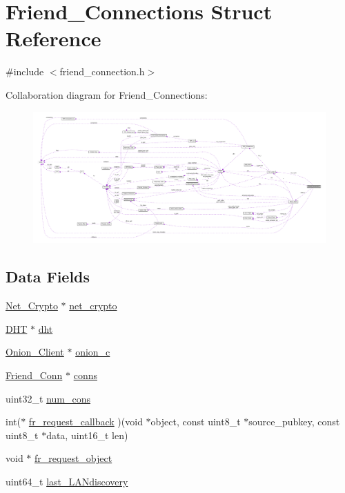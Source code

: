\hypertarget{struct_friend___connections}{\section{Friend\+\_\+\+Connections Struct Reference}
\label{struct_friend___connections}
}


{\ttfamily \#include $<$friend\+\_\+connection.\+h$>$}



Collaboration diagram for Friend\+\_\+\+Connections\+:
\nopagebreak
\begin{figure}[H]
\begin{center}
\leavevmode
\includegraphics[width=350pt]{dd/d84/struct_friend___connections__coll__graph}
\end{center}
\end{figure}
\subsection*{Data Fields}
\begin{DoxyCompactItemize}
\item 
\hyperlink{struct_net___crypto}{Net\+\_\+\+Crypto} $\ast$ \hyperlink{struct_friend___connections_ab06a41217a1e9b5985555e19e088ae94}{net\+\_\+crypto}
\item 
\hyperlink{struct_d_h_t}{D\+H\+T} $\ast$ \hyperlink{struct_friend___connections_a8b3d6ce8745acc52695e252bdb1531b6}{dht}
\item 
\hyperlink{struct_onion___client}{Onion\+\_\+\+Client} $\ast$ \hyperlink{struct_friend___connections_ae202b81f9a2c2fa80fd310a0996795fc}{onion\+\_\+c}
\item 
\hyperlink{struct_friend___conn}{Friend\+\_\+\+Conn} $\ast$ \hyperlink{struct_friend___connections_a2690adb6c61682af2e8592f53e9de9a0}{conns}
\item 
uint32\+\_\+t \hyperlink{struct_friend___connections_a81ac77652d6cc5071baca915581c5dfa}{num\+\_\+cons}
\item 
int($\ast$ \hyperlink{struct_friend___connections_a36e4f0e3167d9e95df5d7f83cbafa7fc}{fr\+\_\+request\+\_\+callback} )(void $\ast$object, const uint8\+\_\+t $\ast$source\+\_\+pubkey, const uint8\+\_\+t $\ast$data, uint16\+\_\+t len)
\item 
void $\ast$ \hyperlink{struct_friend___connections_abd31f2a386ec582b378de4fc3f05ea6c}{fr\+\_\+request\+\_\+object}
\item 
uint64\+\_\+t \hyperlink{struct_friend___connections_a4f77ba6531c78b4f6a2a46843d06cc26}{last\+\_\+\+L\+A\+Ndiscovery}
\end{DoxyCompactItemize}


